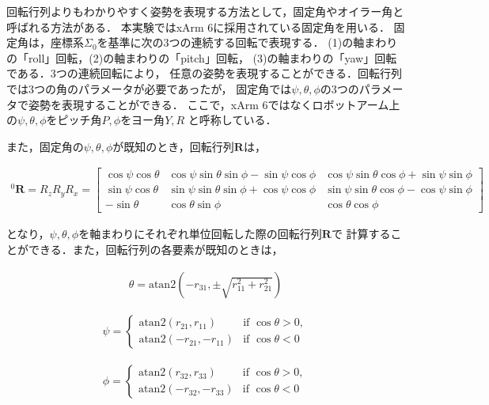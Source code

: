 回転行列よりもわかりやすく姿勢を表現する方法として，固定角やオイラー角と呼ばれる方法がある．
本実験ではxArm 6に採用されている固定角を用いる．
固定角は，座標系$\Sigma_0$を基準に次の3つの連続する回転で表現する．
(1)の軸まわりの「roll」回転，(2)の軸まわりの「pitch」回転，
(3)の軸まわりの「yaw」回転である．3つの連続回転により，
任意の姿勢を表現することができる．回転行列では3つの角のパラメータが必要であったが，
固定角では$\psi, \theta, \phi$の3つのパラメータで姿勢を表現することができる．
ここで，xArm 6ではなくロボットアーム上の$\psi, \theta, \phi$をピッチ角$P, \phi$をヨー角$Y, R$
と呼称している．

また，固定角の$\psi, \theta, \phi$が既知のとき，回転行列$\mathbf{R}$は，

\begin{align}
  ^0\mathbf{R} = R_z R_y R_x = 
  \begin{bmatrix} 
    \cos \psi \cos \theta & \cos \psi \sin \theta \sin \phi - \sin \psi \cos \phi & \cos \psi \sin \theta \cos \phi + \sin \psi \sin \phi \\ 
    \sin \psi \cos \theta & \sin \psi \sin \theta \sin \phi + \cos \psi \cos \phi & \sin \psi \sin \theta \cos \phi - \cos \psi \sin \phi \\ 
    - \sin \theta         & \cos \theta \sin \phi                                 & \cos \theta \cos \phi 
  \end{bmatrix} \tag{2.17}
\end{align}

となり，$\psi, \theta, \phi$を軸まわりにそれぞれ単位回転した際の回転行列$\mathbf{R}$で
計算することができる．また，回転行列の各要素が既知のときは，

\begin{align}
  \theta = \text{atan2} \left( -r_{31}, \pm \sqrt{r_{11}^2 + r_{21}^2} \right) \tag{2.18}
\end{align}

\begin{align}
  \psi = 
  \begin{cases}
    \text{atan2}(r_{21}, r_{11})   & \text{if } \cos \theta > 0, \\
    \text{atan2}(-r_{21}, -r_{11}) & \text{if } \cos \theta < 0
  \end{cases} \tag{2.19}
\end{align}

\begin{align}
  \phi = 
  \begin{cases}
    \text{atan2}(r_{32}, r_{33})   & \text{if } \cos \theta > 0, \\
    \text{atan2}(-r_{32}, -r_{33}) & \text{if } \cos \theta < 0
  \end{cases} \tag{2.20}
\end{align}

